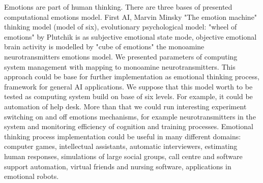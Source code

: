 Emotions are part of human thinking. There are three bases of presented computational emotions model. First AI, Marvin Minsky "The emotion machine"\cite{emotionmachine} thinking model (model of six), evolutionary psychological model: "wheel of emotions" by Plutchik\cite{natureofemotions} is as subjective emotional state mode, objective emotional brain activity is modelled by "cube of emotions" the monoamine neurotransmitters emotions model. We presented parameters of computing system management with mapping to monoamine neurotransmitters. This approach could be base for further implementation as emotional thinking process, framework for general AI applications. We suppose that this model worth to be tested as computing system build on base of six levels. For example, it could be automation of help desk. More than that we could run interesting experiment switching on and off emotions mechanisms, for example neurotransmitters in the system and monitoring efficiency of cognition and training processes. Emotional thinking process implementation could be useful in many different domains: computer games, intellectual assistants, automatic interviewers, estimating human responses, simulations of large social groups, call centre and software support automation, virtual friends and nursing software, applications in emotional robots.